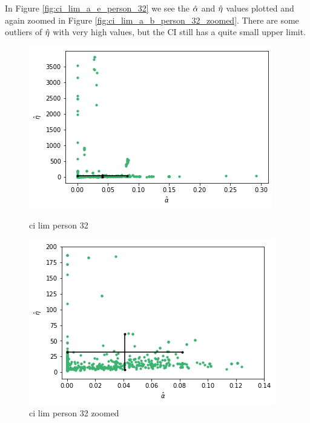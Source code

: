In Figure \ref{fig:ci_lim_a_e_person_32} we see the $\hat{\alpha}$ and $\hat{\eta}$ values plotted and again zoomed in Figure \ref{fig:ci_lim_a_b_person_32_zoomed}. There are some outliers of $\hat{\eta}$ with very high values, but the CI still has a quite small upper limit. 
\begin{figure}
    \centering
    \begin{minipage}{0.48\textwidth}
        \centering
        \includegraphics[scale=0.37]{pictures/ci_lim_a_e_person32.png}
        \caption{ci lim person 32}
        \label{fig:ci_lim_a_e_person_32}
    \end{minipage}\hfill
    \begin{minipage}{0.48\textwidth}
        \centering
        \includegraphics[scale=0.37]{pictures/ci_lim_a_e_person32_zoomed.png}
        \caption{ci lim person 32 zoomed}
        \label{fig:ci_lim_a_e_person_32_zoomed}
    \end{minipage}
\end{figure}


